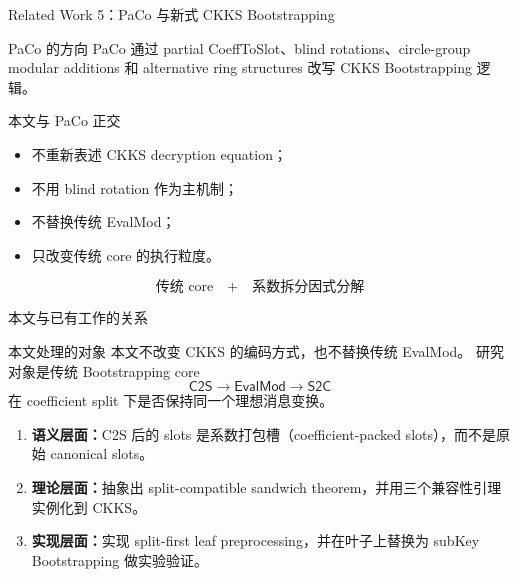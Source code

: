 \documentclass[aspectratio=169, 10pt, xcolor=svgnames, table, UTF8]{ctexbeamer}
\begin{document}
\begin{frame}{Related Work 5：PaCo 与新式 CKKS Bootstrapping}
  \begin{block}{PaCo 的方向}
    PaCo 通过 partial CoeffToSlot、blind rotations、circle-group modular additions 和 alternative ring structures 改写 CKKS Bootstrapping 逻辑。
  \end{block}
  
  \pause
  \begin{alertblock}{本文与 PaCo 正交}
    \begin{itemize}
      \item 不重新表述 CKKS decryption equation；
      \item 不用 blind rotation 作为主机制；
      \item 不替换传统 EvalMod；
      \item 只改变传统 core 的执行粒度。
    \end{itemize}
  \end{alertblock}
  
  \pause
  \begin{center}
    \Large
    \[
    \text{传统 core} \quad+\quad \text{系数拆分因式分解}
    \]
  \end{center}
\end{frame}

\begin{frame}{本文与已有工作的关系}
  \begin{block}{本文处理的对象}
    本文不改变 CKKS 的编码方式，也不替换传统 EvalMod。
    研究对象是传统 Bootstrapping core
    \[
    \mathsf{C2S}\to\mathsf{EvalMod}\to\mathsf{S2C}
    \]
    在 coefficient split 下是否保持同一个理想消息变换。
  \end{block}
  
  \pause
  \begin{enumerate}
    \item \textbf{语义层面：}C2S 后的 slots 是系数打包槽（coefficient-packed slots），而不是原始 canonical slots。
    \item \textbf{理论层面：}抽象出 split-compatible sandwich theorem，并用三个兼容性引理实例化到 CKKS。
    \item \textbf{实现层面：}实现 split-first leaf preprocessing，并在叶子上替换为 subKey Bootstrapping 做实验验证。
  \end{enumerate}
\end{frame}

\end{document}
